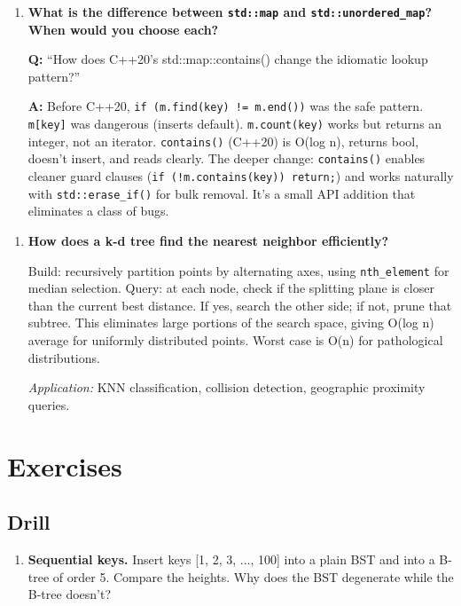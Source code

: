 \begin{enumerate}
\item \textbf{What is the difference between \texttt{std::map} and \texttt{std::unordered\_map}? When would you choose each?}

\textbf{Q:} ``How does C++20's std::map::contains() change the idiomatic lookup pattern?''

\textbf{A:} Before C++20, \texttt{if (m.find(key) != m.end())} was the safe pattern. \texttt{m[key]} was dangerous (inserts default). \texttt{m.count(key)} works but returns an integer, not an iterator. \texttt{contains()} (C++20) is O(log n), returns bool, doesn't insert, and reads clearly. The deeper change: \texttt{contains()} enables cleaner guard clauses (\texttt{if (!m.contains(key)) return;}) and works naturally with \texttt{std::erase\_if()} for bulk removal. It's a small API addition that eliminates a class of bugs.
\end{enumerate}

\begin{enumerate}
\item \textbf{How does a k-d tree find the nearest neighbor efficiently?}

Build: recursively partition points by alternating axes, using \texttt{nth\_element} for median selection. Query: at each node, check if the splitting plane is closer than the current best distance. If yes, search the other side; if not, prune that subtree. This eliminates large portions of the search space, giving O(log n) average for uniformly distributed points. Worst case is O(n) for pathological distributions.

\textit{Application:} KNN classification, collision detection, geographic proximity queries.
\end{enumerate}

\section{Exercises}

\subsection{Drill}

\begin{enumerate}
\item \textbf{Sequential keys.} Insert keys [1, 2, 3, ..., 100] into a plain BST and into a B-tree of order 5. Compare the heights. Why does the BST degenerate while the B-tree doesn't?
\end{enumerate}

